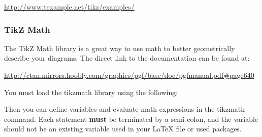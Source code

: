 \begin{center}
\url{http://www.texample.net/tikz/examples/}
\end{center}



\subsubsection{TikZ Math}
The TikZ Math library is a great way to use math to better geometrically describe your diagrams. The direct link to the documentation can be found at:

\begin{center}
\url{http://ctan.mirrors.hoobly.com/graphics/pgf/base/doc/pgfmanual.pdf\#page640}
\end{center}

You must load the tikzmath library using the following:

\begin{center}
\begin{latexcode}
\usetikzlibrary{math}
\end{latexcode}
\end{center}

Then you can define variables and evaluate math expressions in the tikzmath command. Each statement \textbf{must} be terminated by a semi-colon, and the variable should not be an existing variable used in your \LaTeX{} file or used packages.


